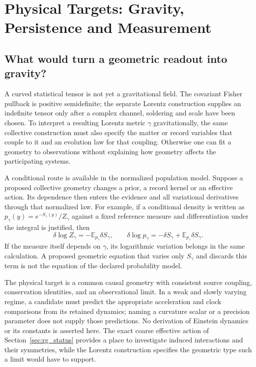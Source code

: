 \section{Physical Targets: Gravity, Persistence and Measurement}\label{sec:speculative_physics}

\subsection{What would turn a geometric readout into gravity?}
\label{sec:gravity_pullback}

A curved statistical tensor is not yet a gravitational field. The covariant Fisher pullback is positive semidefinite; the separate Lorentz construction supplies an indefinite tensor only after a complex channel, soldering and scale have been chosen. To interpret a resulting Lorentz metric $\gamma$ gravitationally, the same collective construction must also specify the matter or record variables that couple to it and an evolution law for that coupling. Otherwise one can fit a geometry to observations without explaining how geometry affects the participating systems.

A conditional route is available in the normalized population model. Suppose a proposed collective geometry changes a prior, a record kernel or an effective action. Its dependence then enters the evidence and all variational derivatives through that normalized law. For example, if a conditional density is written as $p_\gamma(y)=e^{-S_\gamma(y)}/Z_\gamma$ against a fixed reference measure and differentiation under the integral is justified, then
\begin{equation}
\delta\log Z_\gamma=-\mathbb E_{p_\gamma}\delta S_\gamma,
\qquad
\delta\log p_\gamma=-\delta S_\gamma+\mathbb E_{p_\gamma}\delta S_\gamma.
\label{eq:geometry_feedback_normalizer}
\end{equation}
If the measure itself depends on $\gamma$, its logarithmic variation belongs in the same calculation. A proposed geometric equation that varies only $S_\gamma$ and discards this term is not the equation of the declared probability model.

The physical target is a common causal geometry with consistent source coupling, conservation identities, and an observational limit. In a weak and slowly varying regime, a candidate must predict the appropriate acceleration and clock comparisons from its retained dynamics; naming a curvature scalar or a precision parameter does not supply those predictions. No derivation of Einstein dynamics or its constants is asserted here. The exact coarse effective action of Section~\ref{sec:rg_status} provides a place to investigate induced interactions and their symmetries, while the Lorentz construction specifies the geometric type such a limit would have to support.

